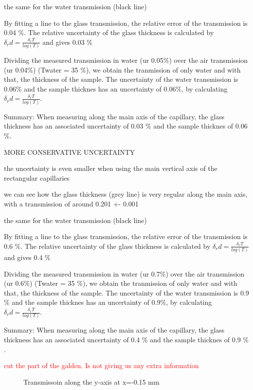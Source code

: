 the same for the water transmission (black line)

By fitting a line to the glass transmission, the relative error of the transmission is 0.04 $\%$. The relative uncertainty of the glass thickness is calculated by $\delta_r d = \frac{\delta_r T}{log(T)}$ and gives 0.03 $\%$

Dividing the measured transmission in water (ur 0.05$\%$) over the air transmission (ur 0.04$\%$) (Twater = 35 $\%$), we obtain the tranmission of only water and with that, the thickness of the sample. The uncertainty of the water transmission is 0.06$\%$ and the sample thicknes has an uncertainty of 0.06$\%$, by calculating $\delta_r d = \frac{\delta_r T}{log(T)}$.

Summary: When measuring along the main axis of the capillary, the glass thickness has an associated uncertainty of 0.03 $\%$ and the sample thicknes of 0.06 $\%$.


MORE CONSERVATIVE UNCERTAINTY

the uncertainty is even smaller when using the main vertical axis of the rectangular capillaries

we can see how the glass thickness (grey line) is very regular along the main axis, with a transmission of around 0.201 +- 0.001

the same for the water transmission (black line)

By fitting a line to the glass transmission, the relative error of the transmission is 0.6 $\%$. The relative uncertainty of the glass thickness is calculated by $\delta_r d = \frac{\delta_r T}{log(T)}$ and gives 0.4 $\%$

Dividing the measured transmission in water (ur 0.7$\%$) over the air transmission (ur 0.6$\%$) (Twater = 35 $\%$), we obtain the tranmission of only water and with that, the thickness of the sample. The uncertainty of the water transmission is 0.9 $\%$ and the sample thicknes has an uncertainty of 0.9$\%$, by calculating $\delta_r d = \frac{\delta_r T}{log(T)}$.

Summary: When measuring along the main axis of the capillary, the glass thickness has an associated uncertainty of 0.4 $\%$ and the sample thicknes of 0.9 $\%$.

\textcolor{red}{cut the part of the galden. Is not giving us any extra information}

\begin{figure}%
	\centering
		
		\caption{Transmissoin along the y-axis at x=-0.15 mm}
		\label{fig:GaldenCalibration}
\end{figure}


